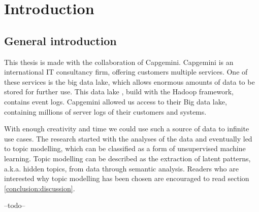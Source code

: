 \chapter{Introduction} \label{ch:introduction}


\section{General introduction}\label{introduction:Generalinformation}
This thesis is made with the collaboration of Capgemini. Capgemini is an international IT consultancy firm, offering customers multiple services. One of these services is the big data lake, which allows enormous amounts of data to be stored for further use. This data lake , build with the Hadoop framework, contains event logs. Capgemini allowed us access to their Big data lake, containing millions of server logs of their customers and systems. 

With enough creativity and time we could use such a source of data to infinite use cases. The research started with the analyses of the data and eventually led to topic modelling, which can be classified as a form of unsupervised machine learning. Topic modelling can be described as the extraction of latent patterns, a.k.a. hidden topics, from data through semantic analysis. Readers who are interested  why topic modelling has been chosen are encouraged to read section \ref{conclusion:discussion}. 

--todo--

\begin{comment}
The intention of this research started with analysing e system logs to help create a model for predicting hardware and software failure for maintenance and automatic self-healing. The huge amount of system logs available from a variety of systems brought the question how to analyse and make use of the logs to predict hardware and software failure.

Current research of big data makes this a suitable problem to solve through recent machine learning techniques. 
During the time spent on this research challenges were met and identified for realising this goal and ended with the usage of Natural Language Processing (NLP) and unsupervised learning.  The untapped amount of raw data makes it possible for many more application, but in further paragraphs it will be made clear why NLP was chosen and what more could be applied on this Big data problem.

 \end{comment}
 
